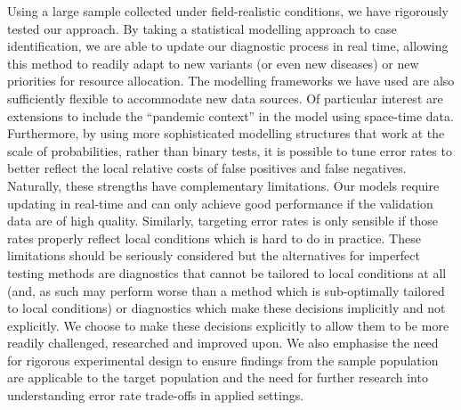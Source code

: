 \documentclass[]{elsarticle} %
\begin{document}
Using a large sample collected under field-realistic conditions, we have rigorously tested our approach.
By taking a statistical modelling approach to case identification, we are able to update our diagnostic process in real time, allowing this method to readily adapt to new variants (or even new diseases) or new priorities for resource allocation.
The modelling frameworks we have used are also sufficiently flexible to accommodate new data sources.
Of particular interest are extensions to include the ``pandemic context'' in the model using space-time data.
Furthermore, by using more sophisticated modelling structures that work at the scale of probabilities, rather than binary tests, it is possible to tune error rates to better reflect the local relative costs of false positives and false negatives.
Naturally, these strengths have complementary limitations.
Our models require updating in real-time and can only achieve good performance if the validation data are of high quality.
Similarly, targeting error rates is only sensible if those rates properly reflect local conditions which is hard to do in practice.
These limitations should be seriously considered but the alternatives for imperfect testing methods are diagnostics that cannot be tailored to local conditions at all (and, as such may perform worse than a method which is sub-optimally tailored to local conditions) or diagnostics which make these decisions implicitly and not explicitly.
We choose to make these decisions explicitly to allow them to be more readily challenged, researched and improved upon.
We also emphasise the need for rigorous experimental design to ensure findings from the sample population are applicable to the target population and the need for further research into understanding error rate trade-offs in applied settings.
\end{document}
